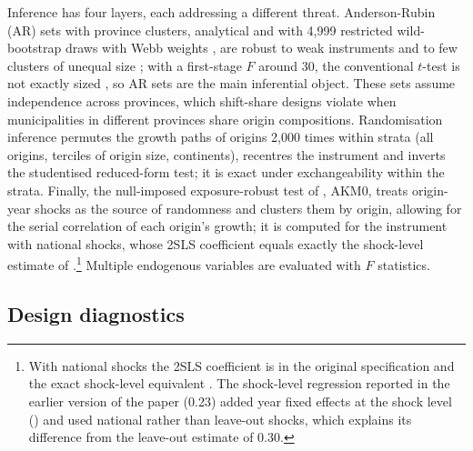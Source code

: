 \documentclass[11pt,a4paper]{article}
\begin{document}
Inference has four layers, each addressing a different threat. Anderson-Rubin (AR) sets with province clusters, analytical and with 4,999 restricted wild-bootstrap draws with Webb weights \citep{davidson2010,roodman2019,webb2023}, are robust to weak instruments and to few clusters of unequal size \citep{mackinnon2023}; with a first-stage $F$ around 30, the conventional $t$-test is not exactly sized \citep{lee2022}, so AR sets are the main inferential object. These sets assume independence across provinces, which shift-share designs violate when municipalities in different provinces share origin compositions. Randomisation inference permutes the growth paths of origins 2,000 times within strata (all origins, terciles of origin size, continents), recentres the instrument and inverts the studentised reduced-form test; it is exact under exchangeability within the strata. Finally, the null-imposed exposure-robust test of \citet{adao2019}, AKM0, treats origin-year shocks as the source of randomness and clusters them by origin, allowing for the serial correlation of each origin's growth; it is computed for the instrument with national shocks, whose 2SLS coefficient equals exactly the shock-level estimate of \citet{borusyak2022}.\footnote{With national shocks the 2SLS coefficient is \natIV{} in the original specification and the exact shock-level equivalent \bhjEq. The shock-level regression reported in the earlier version of the paper (0.23) added year fixed effects at the shock level (\bhjYfe) and used national rather than leave-out shocks, which explains its difference from the leave-out estimate of 0.30.} Multiple endogenous variables are evaluated with \citet{sanderson2016} $F$ statistics.

\subsection{Design diagnostics}
\end{document}
